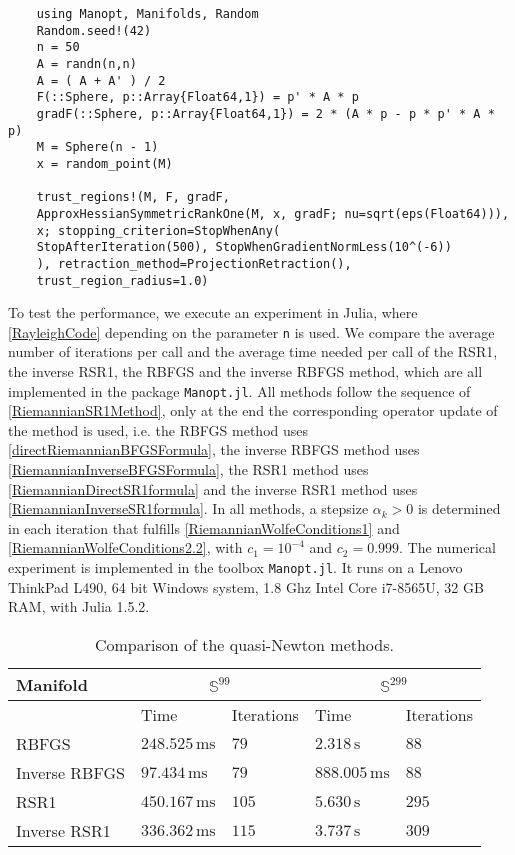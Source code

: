 \begin{lstlisting}
    using Manopt, Manifolds, Random
    Random.seed!(42)
    n = 50
    A = randn(n,n)
    A = ( A + A' ) / 2
    F(::Sphere, p::Array{Float64,1}) = p' * A * p
    gradF(::Sphere, p::Array{Float64,1}) = 2 * (A * p - p * p' * A * p)
    M = Sphere(n - 1)
    x = random_point(M)

    trust_regions!(M, F, gradF,
    ApproxHessianSymmetricRankOne(M, x, gradF; nu=sqrt(eps(Float64))),
    x; stopping_criterion=StopWhenAny(
    StopAfterIteration(500), StopWhenGradientNormLess(10^(-6))
    ), retraction_method=ProjectionRetraction(),
    trust_region_radius=1.0)
\end{lstlisting}
To test the performance, we execute an experiment in Julia, where \cref{RayleighCode} depending on the parameter \lstinline!n! is used. We compare the average number of iterations per call and the average time needed per call of the RSR1, the inverse RSR1, the RBFGS and the inverse RBFGS method, which are all implemented in the package \lstinline!Manopt.jl!. All methods follow the sequence of \cref{RiemannianSR1Method}, only at the end the corresponding operator update of the method is used, i.e. the RBFGS method uses \cref{directRiemannianBFGSFormula}, the inverse RBFGS method uses \cref{RiemannianInverseBFGSFormula}, the RSR1 method uses \cref{RiemannianDirectSR1formula} and the inverse RSR1 method uses \cref{RiemannianInverseSR1formula}. In all methods, a stepsize $\alpha_k > 0$ is determined in each iteration that fulfills \cref{RiemannianWolfeConditions1} and \cref{RiemannianWolfeConditions2.2}, with $c_1 = 10^{−4}$ and $c_2 = 0.999$. The numerical experiment is implemented in the toolbox \lstinline!Manopt.jl!. It runs on a Lenovo ThinkPad L490, 64 bit Windows system, 1.8 Ghz Intel Core i7-8565U, 32 GB RAM, with Julia 1.5.2.
\begin{table}[H]\label{tab:Results}
    \center
        \begin{tabular}{l l l l l }
            \toprule
            Manifold & \multicolumn{2}{c}{$\mathbb{S}^{99}$} & \multicolumn{2}{c}{$\mathbb{S}^{299}$}   \\ 
            \midrule
            & Time & Iterations & Time & Iterations  \\ 
            \midrule
            RBFGS & $248.525 \, \mathrm{ms}$ & $79$ & $2.318 \, \mathrm{s}$ & $88$  \\ 
            \midrule
            Inverse RBFGS & $97.434 \, \mathrm{ms}$ & $79$ & $888.005 \, \mathrm{ms}$ & $88$   \\
            \midrule
            RSR1 & $450.167 \, \mathrm{ms}$ & $105$ & $5.630 \, \mathrm{s}$ & $295$  \\ 
            \midrule
            Inverse RSR1 & $336.362 \, \mathrm{ms}$ & $115$ & $3.737 \, \mathrm{s}$ & $309$   \\
            \bottomrule
        \end{tabular}

    \caption{Comparison of the quasi-Newton methods.}
\end{table}

